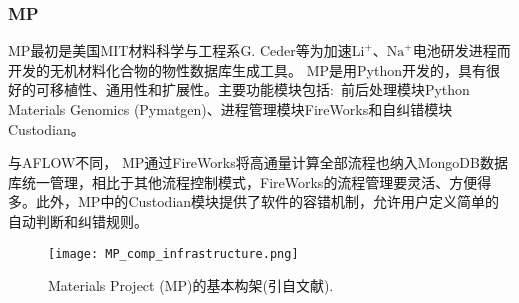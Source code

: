 \subsubsection{\rm{MP}}
\textrm{MP}最初是美国\textrm{MIT}材料科学与工程系\textrm{G. Ceder}等为加速$\mathrm{Li}^+$、$\mathrm{Na}^+$电池研发进程而开发的无机材料化合物的物性数据库生成工具。%
\textrm{MP}是用\textrm{Python}开发的，具有很好的可移植性、通用性和扩展性。主要功能模块包括:~前后处理模块\textrm{Python Materials Genomics (Pymatgen)}、进程管理模块\textrm{FireWorks}和自纠错模块\textrm{Custodian}。

与\textrm{AFLOW}不同， \textrm{MP}通过\textrm{FireWorks}将高通量计算全部流程也纳入\textrm{MongoDB}数据库统一管理，相比于其他流程控制模式，\textrm{FireWorks}的流程管理要灵活、方便得多。此外，\textrm{MP}中的\textrm{Custodian}模块提供了软件的容错机制，允许用户定义简单的自动判断和纠错规则。
\begin{figure}[h!]
\centering
\texttt{[image: MP\_comp\_infrastructure.png]}%
\caption{\textrm{Materials Project (MP)}的基本构架(引自文献).}%
\label{Auto_Flow_Platform-2}
\end{figure}

